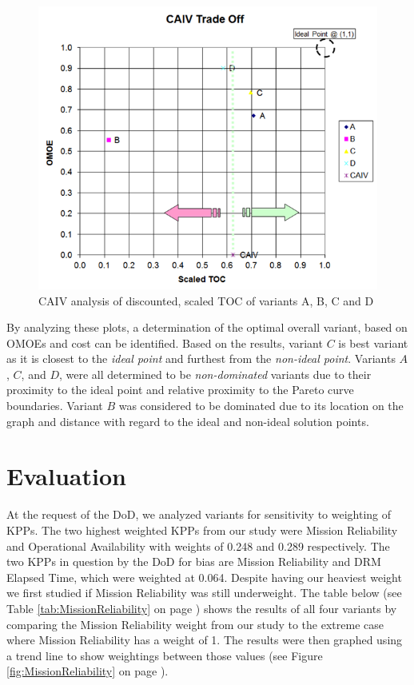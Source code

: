\documentclass[letterpaper,10pt]{article}
\begin{document}
\begin{figure}[h!tbp]
	\begin{center}
		\includegraphics[scale=0.65]{images/CAIV2.png}
	\end{center}
	\caption{CAIV analysis of discounted, scaled TOC of variants A, B, C and D}
	\label{fig:CAIV2}
\end{figure}

By analyzing these plots, a determination of the optimal overall variant, based on OMOEs and cost can be identified. Based on the results, variant $C$ is best variant as it is closest to the \emph{ideal point} and furthest from the \emph{non-ideal point}. Variants $A$, $C$, and $D$, were all determined to be \emph{non-dominated} variants due to their proximity to the ideal point and relative proximity to the Pareto curve boundaries. Variant $B$ was considered to be dominated due to its location on the graph and distance with regard to the ideal and non-ideal solution points.

\section{Evaluation}
At the request of the DoD, we analyzed variants for sensitivity to weighting of KPPs.  The two highest weighted KPPs from our study were Mission Reliability and Operational Availability with weights of 0.248 and 0.289 respectively. The two KPPs in question by the DoD for bias are Mission Reliability and DRM Elapsed Time, which were weighted at 0.064. Despite having our heaviest weight we first studied if Mission Reliability was still underweight. The table below (see Table \ref{tab:MissionReliability} on page \pageref{tab:MissionReliability}) shows the results of all four variants by comparing the Mission Reliability weight from our study to the extreme case where Mission Reliability has a weight of 1. The results were then graphed using a trend line to show weightings between those values (see Figure \ref{fig:MissionReliability} on page \pageref{fig:MissionReliability}).
\end{document}
